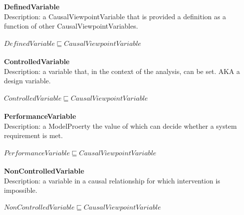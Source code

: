\\\\   \textbf{DefinedVariable}\\Description: a CausalViewpointVariable that is provided a definition as a function of other CausalViewpointVariables.\\
\\$ DefinedVariable \sqsubseteq CausalViewpointVariable$
\\\\   \textbf{ControlledVariable}\\Description: a variable that, in the context of the analysis, can be set. AKA a design variable.\\
\\$ ControlledVariable \sqsubseteq CausalViewpointVariable$
\\\\   \textbf{PerformanceVariable}\\Description: a ModelProerty the value of which can decide whether a system requirement is met.\\
\\$ PerformanceVariable \sqsubseteq CausalViewpointVariable$
\\\\   \textbf{NonControlledVariable}\\Description: a variable in a causal relationship for which intervention is impossible.\\
\\$ NonControlledVariable \sqsubseteq CausalViewpointVariable$
